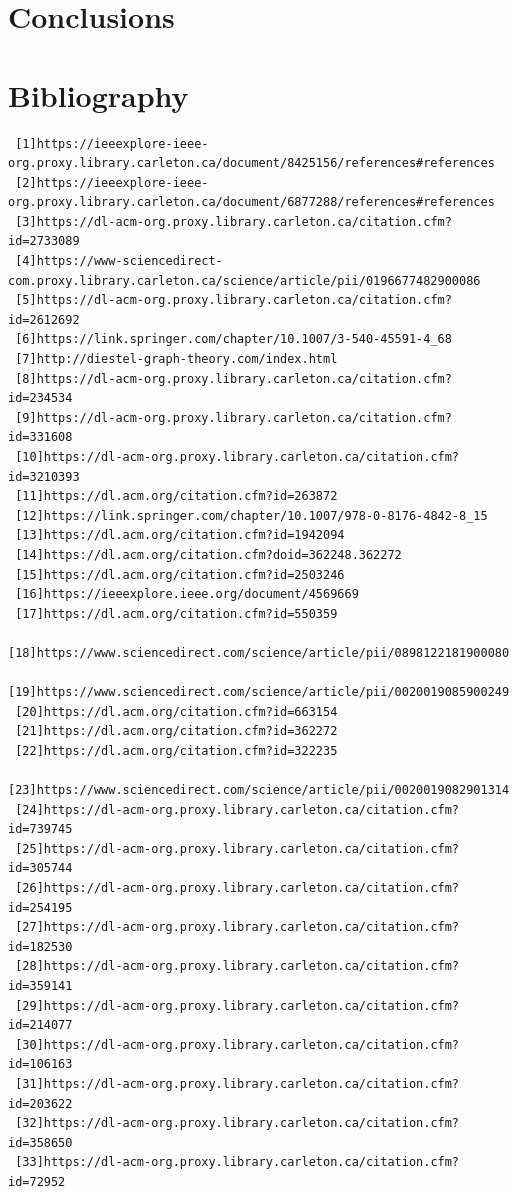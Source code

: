 \documentclass[]{article}
\begin{document}
 \section{Conclusions}
 \section{Bibliography}
 \begin{verbatim}
 [1]https://ieeexplore-ieee-org.proxy.library.carleton.ca/document/8425156/references#references
 [2]https://ieeexplore-ieee-org.proxy.library.carleton.ca/document/6877288/references#references
 [3]https://dl-acm-org.proxy.library.carleton.ca/citation.cfm?id=2733089
 [4]https://www-sciencedirect-com.proxy.library.carleton.ca/science/article/pii/0196677482900086
 [5]https://dl-acm-org.proxy.library.carleton.ca/citation.cfm?id=2612692
 [6]https://link.springer.com/chapter/10.1007/3-540-45591-4_68
 [7]http://diestel-graph-theory.com/index.html
 [8]https://dl-acm-org.proxy.library.carleton.ca/citation.cfm?id=234534 
 [9]https://dl-acm-org.proxy.library.carleton.ca/citation.cfm?id=331608
 [10]https://dl-acm-org.proxy.library.carleton.ca/citation.cfm?id=3210393
 [11]https://dl.acm.org/citation.cfm?id=263872
 [12]https://link.springer.com/chapter/10.1007/978-0-8176-4842-8_15
 [13]https://dl.acm.org/citation.cfm?id=1942094
 [14]https://dl.acm.org/citation.cfm?doid=362248.362272
 [15]https://dl.acm.org/citation.cfm?id=2503246
 [16]https://ieeexplore.ieee.org/document/4569669
 [17]https://dl.acm.org/citation.cfm?id=550359
 [18]https://www.sciencedirect.com/science/article/pii/0898122181900080
 [19]https://www.sciencedirect.com/science/article/pii/0020019085900249
 [20]https://dl.acm.org/citation.cfm?id=663154
 [21]https://dl.acm.org/citation.cfm?id=362272
 [22]https://dl.acm.org/citation.cfm?id=322235
 [23]https://www.sciencedirect.com/science/article/pii/0020019082901314
 [24]https://dl-acm-org.proxy.library.carleton.ca/citation.cfm?id=739745
 [25]https://dl-acm-org.proxy.library.carleton.ca/citation.cfm?id=305744
 [26]https://dl-acm-org.proxy.library.carleton.ca/citation.cfm?id=254195
 [27]https://dl-acm-org.proxy.library.carleton.ca/citation.cfm?id=182530
 [28]https://dl-acm-org.proxy.library.carleton.ca/citation.cfm?id=359141
 [29]https://dl-acm-org.proxy.library.carleton.ca/citation.cfm?id=214077
 [30]https://dl-acm-org.proxy.library.carleton.ca/citation.cfm?id=106163
 [31]https://dl-acm-org.proxy.library.carleton.ca/citation.cfm?id=203622
 [32]https://dl-acm-org.proxy.library.carleton.ca/citation.cfm?id=358650
 [33]https://dl-acm-org.proxy.library.carleton.ca/citation.cfm?id=72952

\end{verbatim}
\end{document}
